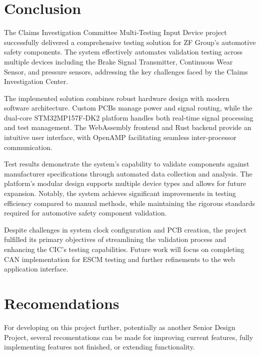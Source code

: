 \documentclass[12pt]{article}
\begin{document}
\pagebreak
\section{Conclusion}

The Claims Investigation Committee Multi-Testing Input Device project
successfully delivered a comprehensive testing solution for ZF Group's
automotive safety components. The system effectively automates validation
testing across multiple devices including the Brake Signal Transmitter,
Continuous Wear Sensor, and pressure sensors, addressing the key challenges
faced by the Claims Investigation Center.

The implemented solution combines robust hardware design with modern software
architecture. Custom PCBs manage power and signal routing, while the dual-core
STM32MP157F-DK2 platform handles both real-time signal processing and test
management. The WebAssembly frontend and Rust backend provide an intuitive user
interface, with OpenAMP facilitating seamless inter-processor communication.

Test results demonstrate the system's capability to validate components against
manufacturer specifications through automated data collection and analysis. The
platform's modular design supports multiple device types and allows for future
expansion. Notably, the system achieves significant improvements in testing
efficiency compared to manual methods, while maintaining the rigorous standards
required for automotive safety component validation.

Despite challenges in system clock configuration and PCB creation, the project
fulfilled its primary objectives of streamlining the validation process and
enhancing the CIC's testing capabilities. Future work will focus on completing
CAN implementation for ESCM testing and further refinements to the web
application interface.


\section{Recomendations}
For developing on this project further, potentially as another Senior Design Project,
several recomentations can be made for improving current features, fully implementing 
features not finished, or extending functionality. 
\end{document}
